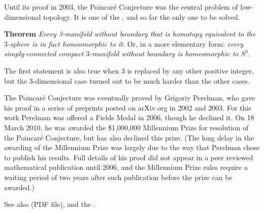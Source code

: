 \documentclass[12pt]{article}
\begin{document}

Until its proof in 2003,
the Poincar\'e Conjecture was the central problem of low-dimensional topology.
It is one of the
,
and so far the only one to be solved.

{\bf Theorem}
\emph{Every 3-manifold without boundary
that is homotopy equivalent to the $3$-sphere
is in fact homeomorphic to it.}
Or, in a more elementary form:
\emph{every simply-connected compact $3$-manifold without boundary
is homeomorphic to $S^3$}.

The first statement is also true
when $3$ is replaced by any other positive integer,
but the 3-dimensional case turned out to be much harder than the other cases.

The Poincar\'e Conjecture was eventually proved by Grigoriy Perelman,
who gave his proof in a series of preprints posted on arXiv.org in 2002 and 2003.
For this work Perelman was offered a Fields Medal in 2006, though he declined it.
On 18 March 2010, he was awarded the \$1,000,000 Millennium Prize
for resolution of the Poincar\'e Conjecture, but has also declined this prize.
(The long delay in the awarding of the Millennium Prize
was largely due to the way that Perelman chose to publish his results.
Full details of his proof did not appear
in a peer reviewed mathematical publication until 2006,
and the Millennium Prize rules require a waiting period of two years
after such publication before the prize can be awarded.)

See also  (PDF file),
and the .
\end{document}
